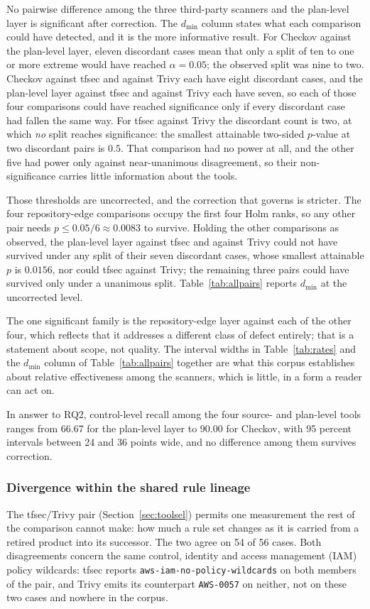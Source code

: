 \documentclass[smallextended]{svjour3}
\begin{document}
No pairwise difference among the three third-party scanners and the plan-level
layer is significant after correction. The $d_{\min}$ column states what each
comparison could have detected, and it is the more informative result. For
Checkov against the plan-level layer, eleven discordant cases mean that only a
split of ten to one or more extreme would have reached $\alpha = 0.05$; the
observed split was nine to two. Checkov against tfsec and against Trivy each have
eight discordant cases, and the plan-level layer against tfsec and against Trivy
each have seven, so each of those four comparisons could have reached
significance only if every discordant case had fallen the same way. For tfsec
against Trivy the discordant count is two, at which \emph{no} split reaches
significance: the smallest attainable two-sided $p$-value at two discordant pairs
is $0.5$. That comparison had no power at all, and the other five had power only
against near-unanimous disagreement, so their non-significance carries little
information about the tools.

Those thresholds are uncorrected, and the correction that governs is stricter.
The four repository-edge comparisons occupy the first four Holm ranks, so any
other pair needs $p \le 0.05/6 \approx 0.0083$ to survive. Holding the other
comparisons as observed, the plan-level layer against tfsec and against Trivy
could not have survived under any split of their seven discordant cases, whose
smallest attainable $p$ is $0.0156$, nor could tfsec against Trivy; the remaining
three pairs could have survived only under a unanimous split.
Table~\ref{tab:allpairs} reports $d_{\min}$ at the uncorrected level.

The one significant family is the repository-edge layer against each of the
other four, which reflects that it addresses a different class of defect
entirely; that is a statement about scope, not quality. The interval widths in
Table~\ref{tab:rates} and the $d_{\min}$ column of Table~\ref{tab:allpairs}
together are what this corpus establishes about relative effectiveness among the
scanners, which is little, in a form a reader can act on.

In answer to RQ2, control-level recall among the four source- and plan-level tools
ranges from 66.67 for the plan-level layer to 90.00 for Checkov, with 95 percent
intervals between 24 and 36 points wide, and no difference among them survives
correction.

\subsubsection{Divergence within the shared rule lineage}
The tfsec/Trivy pair (Section~\ref{sec:toolsel}) permits one measurement the rest
of the comparison cannot make: how much a rule set changes as it is carried from
a retired product into its successor. The two agree on 54 of 56 cases. Both
disagreements concern the same control, identity and access management (IAM)
policy wildcards: tfsec reports
\texttt{aws-iam-no-policy-wildcards} on both members of the pair, and Trivy emits
its counterpart \texttt{AWS-0057} on neither, not on these two cases and nowhere
in the corpus.
\end{document}
